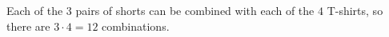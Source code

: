 Each of the $3$ pairs of shorts can be combined with each of the $4$ T-shirts, so there are $3\cdot4=\boxed{12}$ combinations.
